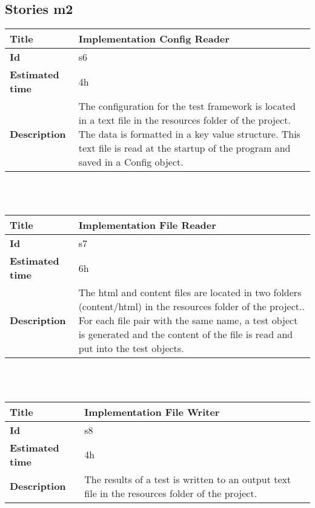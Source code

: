 \subsection {Stories m2}


    \begin{tabular}{ | p{4cm} | p{10cm} |}
    \hline
    \textbf{Title} & Implementation Config Reader \\ \hline
    \textbf{Id} & s6\\ \hline
    \textbf{Estimated time} & 4h \\ \hline
    \textbf{Description} & The configuration for the test framework is located in a text file in the resources folder of the project. The data is formatted  in a key value structure. This text file is read at the startup of the program and saved in a Config object.\\ 
    \hline
    \end{tabular} \\\\


    \begin{tabular}{ | p{4cm} | p{10cm} |}
    \hline
    \textbf{Title} & Implementation File Reader \\ \hline
    \textbf{Id} & s7\\ \hline
    \textbf{Estimated time} & 6h \\ \hline
    \textbf{Description} & The html and content files are located in two folders (content/html) in the resources folder of the project.. For each file pair with the same name, a test object is generated and the content of the file is read and put into the test objects.\\ 
    \hline
    \end{tabular} \\\\


        \begin{tabular}{ | p{4cm} | p{10cm} |}
    \hline
    \textbf{Title} & Implementation File Writer \\ \hline
    \textbf{Id} & s8\\ \hline
    \textbf{Estimated time} & 4h \\ \hline
    \textbf{Description} & The results of a test is written to an output text file in the resources folder of the project.\\ 
    \hline
    \end{tabular} \\\\


